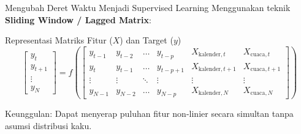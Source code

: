 \documentclass[aspectratio=169, 10pt]{beamer}
\begin{document}
\begin{frame}{Mengubah Deret Waktu Menjadi Supervised Learning}
    Menggunakan teknik \textbf{Sliding Window / Lagged Matrix}:
    \begin{block}{Representasi Matriks Fitur ($X$) dan Target ($y$)}
        \begin{equation}
            \begin{bmatrix}
                y_t \\
                y_{t+1} \\
                \vdots \\
                y_{N}
            \end{bmatrix}
            = f\left(
            \begin{bmatrix}
                y_{t-1} & y_{t-2} & \dots & y_{t-p} & X_{\text{kalender}, t} & X_{\text{cuaca}, t} \\
                y_t & y_{t-1} & \dots & y_{t-p+1} & X_{\text{kalender}, t+1} & X_{\text{cuaca}, t+1} \\
                \vdots & \vdots & \ddots & \vdots & \vdots & \vdots \\
                y_{N-1} & y_{N-2} & \dots & y_{N-p} & X_{\text{kalender}, N} & X_{\text{cuaca}, N}
            \end{bmatrix}
            \right)
        \end{equation}
    \end{block}
    Keunggulan: Dapat menyerap puluhan fitur non-linier secara simultan tanpa asumsi distribusi kaku.
\end{frame}
\end{document}
